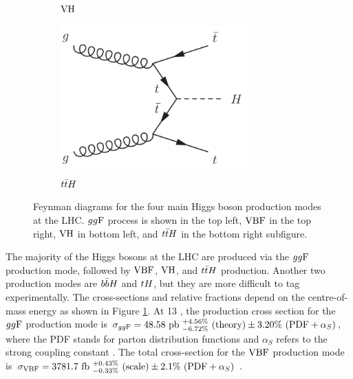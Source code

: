 \begin{figure}[h]
\begin{subfigure}[b]{0.5\textwidth}
    \caption{$\text{VH}$}
  \end{subfigure}%
  \begin{subfigure}[b]{0.5\textwidth}
    \centering
    \includegraphics[width=0.8\textwidth]{figures/theory/ttH}
    \caption{$t\bar{t} H$}
  \end{subfigure}
  \caption[Four main Higgs boson production modes at the LHC.]
  {Feynman diagrams for the four main Higgs boson production modes at the LHC.
  $gg\text{F}$ process is shown in the top left, $\text{VBF}$ in the top right, $\text{VH}$ in bottom left, and
  $t\bar{t} H$ in the bottom right subfigure.}
   \label{fig:the:prod}
\end{figure}

The majority of the Higgs bosons at the LHC are produced via the $gg\text{F}$ production mode,
followed by $\text{VBF}$, $\text{VH}$, and $t\bar{t} H$ production. Another two production modes are $b\bar{b} H$
and $tH$, but they are more difficult to tag experimentally. The cross-sections and
relative fractions depend on the centre-of-mass energy as shown in Figure \ref{fig:the:prod}.
At 13 \TeV, the production cross section for the $gg\text{F}$ production mode is
$\sigma_{gg\text{F}} = 48.58~\text{pb}
~^{+4.56\%}_{-6.72\%}~(\text{theory})
\pm 3.20\%~(\text{PDF}+\alpha_S)$,
where the PDF stands for parton distribution functions and $\alpha_S$ refers to the strong
coupling constant \cite{deFlorian:2016spz}. The total cross-section for the $\text{VBF}$ production mode is
$\sigma_{\text{VBF}} = 3781.7~\text{fb}
~^{+0.43\%}_{-0.33\%}~(\text{scale})
\pm 2.1\%~(\text{PDF}+\alpha_S) $ \cite{deFlorian:2016spz}.

